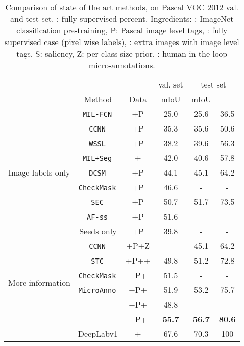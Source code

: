 \documentclass[british,10pt,twocolumn,letterpaper]{article}
\providecommand{\tabularnewline}{\\}
\begin{document}
\begin{table}
\begin{centering}
\begingroup
\setlength{\tabcolsep}{0.15em} 
\begin{tabular}{cccccc}
 &  &  & val. set & \multicolumn{2}{c}{test set}\tabularnewline
 & Method & Data & mIoU & mIoU & \tabularnewline
\hline 
\hline 
\multirow{9}{*}{\begin{turn}{90}
{\small{}Image labels only}
\end{turn}} & \texttt{MIL-FCN}\,\cite{Pathak2015Iclrw} & +P & 25.0 & 25.6 & 36.5\tabularnewline
 & \texttt{CCNN}\,\cite{Pathak2015Iccv} & +P & 35.3 & 35.6 & 50.6\tabularnewline
 & \texttt{WSSL}\,\cite{Papandreou2015Iccv} & +P & 38.2 & 39.6 & 56.3\tabularnewline
 & \texttt{MIL+Seg}\,\cite{Pinheiro2015Cvpr} & + & 42.0 & 40.6 & 57.8\tabularnewline
 & \texttt{DCSM}\,\cite{Shimoda2016Eccv} & +P & 44.1 & 45.1 & 64.2\tabularnewline
 & \texttt{CheckMask}\,\cite{Saleh2016Eccv} & +P & 46.6 & - & -\tabularnewline
 & \texttt{SEC}\,\cite{kolesnikov2016seed} & +P & 50.7 & 51.7 & 73.5\tabularnewline
 & \texttt{AF-ss}\,\cite{Qi2016Eccv} & +P & 51.6 & - & -\tabularnewline
\cline{2-6} 
 & Seeds only & +P & 39.8 & - & -\tabularnewline
\hline 
\multirow{6}{*}{\begin{turn}{90}
{\small{}More information}
\end{turn}} & \texttt{CCNN}\,\cite{Pathak2015Iccv} & +P+Z & - & 45.1 & 64.2\tabularnewline
 & \texttt{STC}\,\cite{Wei2015ArXiv} & +P++ & 49.8 & 51.2 & 72.8\tabularnewline
 & \texttt{CheckMask}\,\cite{Saleh2016Eccv} & +P+ & 51.5 & - & -\tabularnewline
 & \texttt{MicroAnno}\,\cite{Kolesnikov2016Bmvc} & +P+ & 51.9 & 53.2 & 75.7\tabularnewline
\cline{2-6} 
 &  & +P+ & 48.8 & - & -\tabularnewline
 &  & +P+ & \textbf{55.7} & \textbf{56.7} & \textbf{80.6}\tabularnewline
\hline 
 & DeepLabv1 & + & 67.6 & 70.3 & 100\tabularnewline
\end{tabular}\endgroup
\par\end{centering}
\caption{\label{tab:pascal-results-others}Comparison of state of the art methods,
on Pascal VOC 2012 val.\emph{ }and test set. : fully
supervised percent. Ingredients: : ImageNet classification
pre-training, P: Pascal image level tags, : fully
supervised case (pixel wise labels), :  extra images
with image level tags, S: saliency, Z: per-class size prior, :
human-in-the-loop micro-annotations.}
\end{table}
\end{document}
